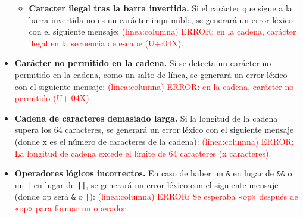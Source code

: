 \begin{itemize}[left=1cm]
\begin{itemize}
        \item \textbf{Caracter ilegal tras la barra invertida.} Si el carácter que sigue a la barra invertida no es un carácter imprimible, se generará un error léxico con el siguiente mensaje: \textcolor{red}{(línea:columna) ERROR: en la cadena, carácter ilegal en la secuencia de escape (U+{:04X}).}
    \end{itemize}
    \item \textbf{Carácter no permitido en la cadena.} Si se detecta un carácter no permitido en la cadena, como un salto de línea, se generará un error léxico con el siguiente mensaje: \textcolor{red}{(línea:columna) ERROR: en la cadena, carácter no permitido (U+{:04X}).}
    \item \textbf{Cadena de caracteres demasiado larga.} Si la longitud de la cadena supera los 64 caracteres, se generará un error léxico con el siguiente mensaje (donde x es el número de caracteres de la cadena): \textcolor{red}{(línea:columna) ERROR: La longitud de cadena excede el límite de 64 caracteres (x caracteres).}
    \item \textbf{Operadores lógicos incorrectos.} En caso de haber un \verb!&! en lugar de \verb!&&! o un \verb!|! en lugar de \verb!||!, se generará un error léxico con el siguiente mensaje (donde op será \verb!&! o \verb!|!): \textcolor{red}{(línea:columna) ERROR: Se esperaba «op» después de «op» para formar un operador.}
\end{itemize}